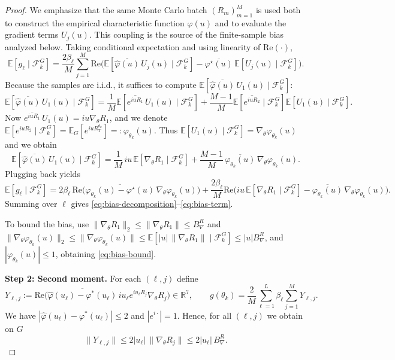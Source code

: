 \documentclass[10pt,a4paper]{amsart}
\newcommand\EE{\mathbb E}
\newcommand\RR{\mathbb R}
\newcommand\cF{\mathcal F}
\begin{document}
\begin{proof}
We emphasize that the same Monte Carlo batch
$(R_m)_{m=1}^M$ is used both to construct the empirical characteristic function
$\widehat\varphi(u)$ and to evaluate the gradient terms $U_j(u)$.
This coupling is the source of the finite-sample bias analyzed below. Taking conditional expectation and using linearity of $\text{Re}(\cdot)$,
\[
\EE[g_\ell\mid \cF_k^G]
=
\frac{2\beta_\ell}{M}\sum_{j=1}^M
\text{Re}\Big(\EE[\overline{\widehat\varphi(u)}\,U_j(u)\mid \cF_k^G]
-\overline{\varphi^\star(u)}\,\EE[U_j(u)\mid \cF_k^G]\Big).
\]
Because the samples are i.i.d., it suffices to compute $\EE[\overline{\widehat\varphi(u)}\,U_1(u)\mid \cF_k^G]$:
\[
\EE[\overline{\widehat\varphi(u)}\,U_1(u)\mid \cF_k^G]
=
\frac1M\EE[\overline{e^{iu R_1}}\,U_1(u)\mid \cF_k^G]
+\frac{M-1}{M}\EE[\overline{e^{iu R_2}}\mid \cF_k^G]\EE[U_1(u)\mid \cF_k^G].
\]
Now $\overline{e^{iu R_1}}\,U_1(u)= iu \nabla_\theta R_1$,
and we denote $\EE[{e^{iu R_2}}\mid \cF_k^G]=\EE_G[{e^{iu R_T^{\theta_k}}}] =:{\varphi_{\theta_k}(u)}$.
Thus $\EE[U_1(u)\mid \cF_k^G]=\nabla_\theta\varphi_{\theta_k}(u)$
and we obtain
\[
\EE[\overline{\widehat\varphi(u)}\,U_1(u)\mid \cF_k^G]
=
\frac1M\,iu\,\EE[\nabla_\theta R_1\mid \cF_k^G]
+\frac{M-1}{M}\,\overline{\varphi_{\theta_k}(u)}\,\nabla_\theta\varphi_{\theta_k}(u).
\]
Plugging back yields
\[
\EE[g_\ell\mid \cF_k^G]
=
2\beta_\ell\,\text{Re}\Big(\overline{\varphi_{\theta_k}(u)-\varphi^\star(u)}\,\nabla_\theta\varphi_{\theta_k}(u)\Big)
+\frac{2\beta_\ell}{M}\text{Re}\Big(iu\,\EE[\nabla_\theta R_1\mid \cF_k^G]-\overline{\varphi_{\theta_k}(u)}\,\nabla_\theta\varphi_{\theta_k}(u)\Big).
\]
Summing over $\ell$ gives \eqref{eq:bias-decomposition}--\eqref{eq:bias-term}.

To bound the bias, use $\|\nabla_\theta R_1\|_2\le \|\nabla_\theta R_1\|\le B_\nabla^R$ and
$\|\nabla_\theta\varphi_{\theta_k}(u)\|_2
\le \|\nabla_\theta\varphi_{\theta_k}(u)\|
\le \EE[|u|\,\|\nabla_\theta R_1\|\mid \cF_k^G ]\le |u| B_\nabla^R$,
and $|\varphi_{\theta_k}(u)|\le 1$, obtaining \eqref{eq:bias-bound}.

\medskip
\noindent\textbf{Step 2: Second moment.}
For each $(\ell,j)$ define
\[
Y_{\ell,j}
:=\mathrm{Re}\Big(\overline{\hat{\varphi}(u_\ell)-\varphi^*(u_\ell)}\,iu_\ell e^{iu_\ell R_j}\nabla_\theta R_j\Big)\in\RR^7,
\qquad
g(\theta_k)=\frac{2}{M}\sum_{\ell=1}^{L}\beta_\ell\sum_{j=1}^M Y_{\ell,j}.
\]
We have
$|\hat{\varphi}(u_\ell)-\varphi^*(u_\ell)|\le  2$
and $|e^{i\cdot}|=1$. Hence, for all $(\ell,j)$ we obtain on  $G$
\begin{equation}\label{eq:Y-bound}
\|Y_{\ell,j}\|
\le 2|u_\ell|\,\|\nabla_\theta R_j\|
\le 2|u_\ell|\,B_\nabla^R.
\end{equation}


\end{proof}
\end{document}
